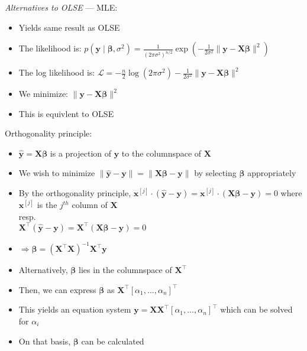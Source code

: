 \emph{Alternatives to OLSE} --- 
MLE:
\begin{itemize}
    \item Yields same result as OLSE
    \item The likelihood is:
    $
    p(\boldsymbol{y} \mid \boldsymbol{\beta}, \sigma^2) = \frac{1}{(2\pi\sigma^2)^{n/2}} \exp\left(-\frac{1}{2\sigma^2} \|\boldsymbol{y} - \boldsymbol{X}\boldsymbol{\beta}\|^2 \right)
    $
    \item The log likelihood is:
    $
    \mathcal{L} = -\frac{n}{2} \log(2\pi\sigma^2) - \frac{1}{2\sigma^2} \|\boldsymbol{y} - \boldsymbol{X}\boldsymbol{\beta}\|^2
    $
    \item We minimize: $ \|\boldsymbol{y} - \boldsymbol{X}\boldsymbol{\beta}\|^2$
    \item This is equivlent to OLSE
\end{itemize}
Orthogonality principle:
\begin{itemize}
    \item $\hat{\boldsymbol{y}} = \boldsymbol{X}\boldsymbol{\beta}$ is a projection of $\boldsymbol{y}$ to the columnspace of $\boldsymbol{X}$
    \item We wish to minimize $\| \hat{\boldsymbol{y}} - \boldsymbol{y} \| = \| \boldsymbol{X}\boldsymbol{\beta} - \boldsymbol{y} \|$ by selecting $\boldsymbol{\beta}$ appropriately
    \item By the orthogonality principle, $\boldsymbol{x}^{[j]} \cdot (\hat{\boldsymbol{y}} - \boldsymbol{y}) = \boldsymbol{x}^{[j]} \cdot (\boldsymbol{X}\boldsymbol{\beta} - \boldsymbol{y}) = 0$ where $\boldsymbol{x}^{[j]}$ is the $j^{th}$ column of $\boldsymbol{X}$\\
    resp.\\
    $\boldsymbol{X}^\intercal (\hat{\boldsymbol{y}} - \boldsymbol{y}) = \boldsymbol{X}^\intercal(\boldsymbol{X}\boldsymbol{\beta} - \boldsymbol{y}) = 0$
    \item $\Rightarrow \boldsymbol{\beta} = (\boldsymbol{X}^\intercal \boldsymbol{X})^{-1}  \boldsymbol{X}^\intercal \boldsymbol{y}$
    \item Alternatively, $\boldsymbol{\beta}$ lies in the columnspace of $\boldsymbol{X}^\intercal$
    \item Then, we can express $\boldsymbol{\beta}$ as $\boldsymbol{X}^\intercal [\alpha_1, ..., \alpha_n]^\intercal$
    \item This yields an equation system $\boldsymbol{y} = \boldsymbol{X} \boldsymbol{X}^\intercal [\alpha_1, ..., \alpha_n]^\intercal$ which can be solved for $\alpha_i$
    \item On that basis, $\boldsymbol{\beta}$ can be calculated
\end{itemize}

